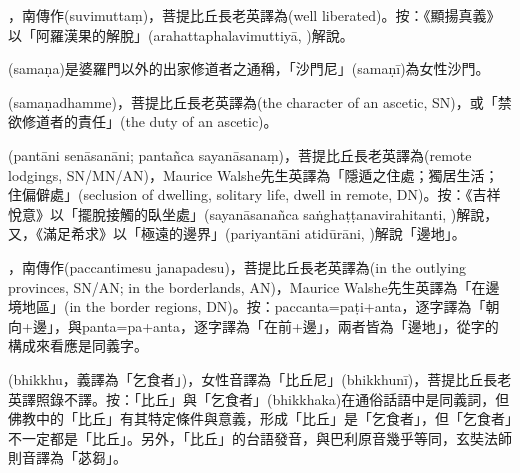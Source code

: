 \startitemgroup[noteitems]
\item{}，南傳作(suvimuttaṃ)，菩提比丘長老英譯為(well liberated)。按：《顯揚真義》以「阿羅漢果的解脫」(arahattaphalavimuttiyā, )解說。
\stopitemgroup

\startitemgroup[noteitems]
\item{}(samaṇa)是婆羅門以外的出家修道者之通稱，「沙門尼」(samaṇī)為女性沙門。
\item{}(samaṇadhamme)，菩提比丘長老英譯為(the character of an ascetic, SN)，或「禁欲修道者的責任」(the duty of an ascetic)。
\stopitemgroup

\startitemgroup[noteitems]
\item{}(pantāni senāsanāni; pantañca sayanāsanaṃ)，菩提比丘長老英譯為(remote lodgings, SN/MN/AN)，Maurice Walshe先生英譯為「隱遁之住處；獨居生活；住偏僻處」(seclusion of dwelling, solitary life, dwell in remote, DN)。按：《吉祥悅意》以「擺脫接觸的臥坐處」(sayanāsanañca saṅghaṭṭanavirahitanti, )解說，又，《滿足希求》以「極遠的邊界」(pariyantāni atidūrāni, )解說「邊地」。
\item{}，南傳作(paccantimesu janapadesu)，菩提比丘長老英譯為(in the outlying provinces, SN/AN; in the borderlands, AN)，Maurice Walshe先生英譯為「在邊境地區」(in the border regions, DN)。按：paccanta=paṭi+anta，逐字譯為「朝向+邊」，與panta=pa+anta，逐字譯為「在前+邊」，兩者皆為「邊地」，從字的構成來看應是同義字。
\stopitemgroup

\startitemgroup[noteitems]
\item{}(bhikkhu，義譯為「乞食者」)，女性音譯為「比丘尼」(bhikkhunī)，菩提比丘長老英譯照錄不譯。按：「比丘」與「乞食者」(bhikkhaka)在通俗話語中是同義詞，但佛教中的「比丘」有其特定條件與意義，形成「比丘」是「乞食者」，但「乞食者」不一定都是「比丘」。另外，「比丘」的台語發音，與巴利原音幾乎等同，玄奘法師則音譯為「苾芻」。
\stopitemgroup

